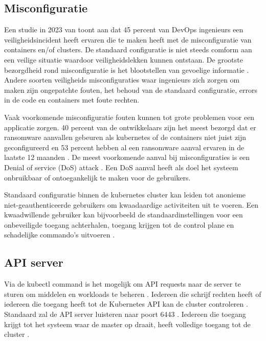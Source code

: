 \subsection{Misconfiguratie}
Een studie in 2023 van \textcite{red-hat-2023} toont aan dat 45 percent van DevOps ingenieurs een veiligheidsincident heeft ervaren die te maken heeft met de misconfiguratie van containers en/of clusters. De standaard configuratie is niet steeds comform aan een veilige situatie waardoor veiligheidslekken kunnen ontstaan. De grootste bezorgdheid rond misconfiguratie is het blootstellen van gevoelige informatie \autocite{red-hat-2023}. Andere soorten veiligheids misconfiguraties waar ingenieurs zich zorgen om maken zijn ongepatchte fouten, het behoud van de standaard configuratie, errors in de code en containers met foute rechten. \newline

Vaak voorkomende misconfiguratie fouten kunnen tot grote problemen voor een applicatie zorgen. 40 percent van de ontwikkelaars zijn het meest bezorgd dat er ransomware aanvallen gebeuren als kubernetes of de containers niet juist zijn geconfigureerd en 53 percent hebben al een ransomware aanval ervaren in de laatste 12 maanden \autocite{red-hat-2023}. De meest voorkomende aanval bij misconfiguraties is een Denial of service (DoS) attack \autocite{red-hat-2023}. Een DoS aanval heeft als doel het systeem onbruikbaar of ontoegankelijk te maken voor de gebruikers. \newline

Standaard configuratie binnen de kubernetes cluster kan leiden tot anonieme niet-geauthenticeerde gebruikers om kwaadaardige activiteiten uit te voeren. Een kwaadwillende gebruiker kan bijvoorbeeld de standaardinstellingen voor een onbeveiligde toegang achterhalen, toegang krijgen tot de control plane en schadelijke commando's uitvoeren \autocite{shamim2020xi}.

\subsection{API server}
Via de kubectl command is het mogelijk om API requests naar de server te sturen om middelen en workloads te beheren \autocite{KubernetesDocs-2023}. Iedereen die schrijf rechten heeft of iedereen die toegang heeft tot de Kubernetes API kan de cluster controleren \autocite{KubernetesDocs-2023}. 
Standaard zal de API server luisteren naar poort 6443 \autocite{KubernetesDocs-2023}. Iedereen die toegang krijgt tot het systeem waar de master op draait, heeft volledige toegang tot de cluster \autocite{Rice2018}. \newline

